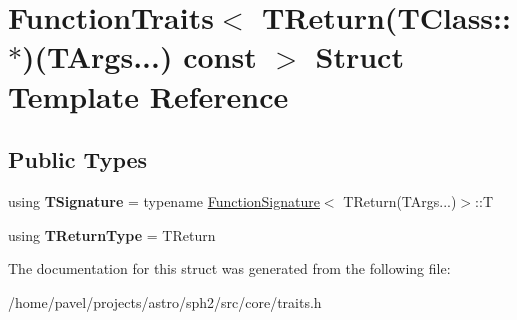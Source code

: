 \hypertarget{structFunctionTraits_3_01TReturn_07TClass_1_1_5_08_07TArgs_8_8_8_08_01const_01_4}{}\section{Function\+Traits$<$ T\+Return(T\+Class\+:\+:$\ast$)(T\+Args...) const $>$ Struct Template Reference}
\label{structFunctionTraits_3_01TReturn_07TClass_1_1_5_08_07TArgs_8_8_8_08_01const_01_4}
\subsection*{Public Types}
\begin{DoxyCompactItemize}
\item 
\hypertarget{structFunctionTraits_3_01TReturn_07TClass_1_1_5_08_07TArgs_8_8_8_08_01const_01_4_a0163b350a80b316c663b1a3c44c677cf}{}\label{structFunctionTraits_3_01TReturn_07TClass_1_1_5_08_07TArgs_8_8_8_08_01const_01_4_a0163b350a80b316c663b1a3c44c677cf} 
using {\bfseries T\+Signature} = typename \hyperlink{structFunctionSignature}{Function\+Signature}$<$ T\+Return(T\+Args...)$>$\+::T
\item 
\hypertarget{structFunctionTraits_3_01TReturn_07TClass_1_1_5_08_07TArgs_8_8_8_08_01const_01_4_aa39737a1566ded005a47ab3f18199229}{}\label{structFunctionTraits_3_01TReturn_07TClass_1_1_5_08_07TArgs_8_8_8_08_01const_01_4_aa39737a1566ded005a47ab3f18199229} 
using {\bfseries T\+Return\+Type} = T\+Return
\end{DoxyCompactItemize}


The documentation for this struct was generated from the following file\+:\begin{DoxyCompactItemize}
\item 
/home/pavel/projects/astro/sph2/src/core/traits.\+h\end{DoxyCompactItemize}
